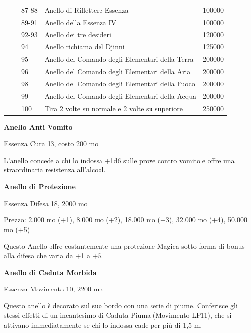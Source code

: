 \documentclass[a4paper,11pt,twoside,openany]{book}
\begin{document}
\begin{tabular}{L{2cm} L{2cm} L{2cm} L{8cm} L{2cm}}
	 &    & 87-88             & Anello di Riflettere Essenza        & 100000\\
	 &    & 89-91             & Anello della Essenza IV & 100000\\
	 &    & 92-93             & Anello dei tre desideri  & 120000\\
	 &    & 94& Anello richiama del Djinni            & 125000\\
	 &    & 95& Anello del Comando degli Elementari della Terra  & 200000\\
	 &    & 96& Anello del Comando degli Elementari della Aria    & 200000\\
	 &    & 98& Anello del Comando degli Elementari della Fuoco  & 200000\\
	 &    & 99& Anello del Comando degli Elementari della Acqua  & 200000\\
	 &    & 100               & Tira 2 volte su normale e 2 volte su superiore          & 250000\\
\end{tabular}

\pagebreak

\textbf{Anello Anti Vomito}

Essenza Cura 13, costo 200 mo

L'anello concede a chi lo indossa +1d6 sulle prove contro vomito e offre una straordinaria resistenza all'alcool.

\textbf{Anello di Protezione}

Essenza Difesa 18, 2000 mo

Prezzo: 2.000 mo (+1), 8.000 mo (+2), 18.000 mo (+3), 32.000 mo (+4),
50.000 mo (+5)

Questo Anello offre costantemente una protezione Magica sotto forma di bonus alla difesa che varia da +1 a +5.

\textbf{Anello di Caduta Morbida}

Essenza Movimento 10, 2200 mo

Questo anello è decorato sul suo bordo con una serie di piume. Conferisce gli stessi effetti di un incantesimo di Caduta Piuma (Movimento LP11), che si attivano immediatamente se chi lo indossa cade per più di 1,5 m.
\end{document}
